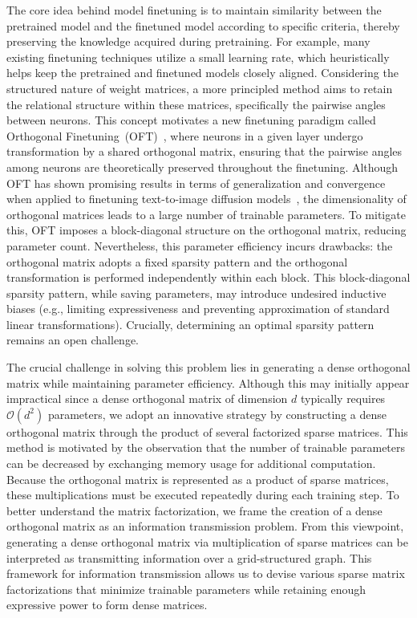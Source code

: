 The core idea behind model finetuning is to maintain similarity between the pretrained model and the finetuned model according to specific criteria, thereby preserving the knowledge acquired during pretraining. For example, many existing finetuning techniques utilize a small learning rate, which heuristically helps keep the pretrained and finetuned models closely aligned. Considering the structured nature of weight matrices, a more principled method aims to retain the relational structure within these matrices, specifically the pairwise angles between neurons. This concept motivates a new finetuning paradigm called Orthogonal Finetuning~(OFT)~\cite{qiu2023controlling}, where neurons in a given layer undergo transformation by a shared orthogonal matrix, ensuring that the pairwise angles among neurons are theoretically preserved throughout the finetuning. Although OFT has shown promising results in terms of generalization and convergence when applied to finetuning text-to-image diffusion models~\cite{qiu2023controlling}, the dimensionality of orthogonal matrices leads to a large number of trainable parameters. To mitigate this, OFT imposes a block-diagonal structure on the orthogonal matrix, reducing parameter count. Nevertheless, this parameter efficiency incurs drawbacks: the orthogonal matrix adopts a fixed sparsity pattern and the orthogonal transformation is performed independently within each block. This block-diagonal sparsity pattern, while saving parameters, may introduce undesired inductive biases (e.g., limiting expressiveness and preventing approximation of standard linear transformations). Crucially, determining an optimal sparsity pattern remains an open challenge.

The crucial challenge in solving this problem lies in generating a dense orthogonal matrix while maintaining parameter efficiency. Although this may initially appear impractical since a dense orthogonal matrix of dimension $d$ typically requires $\mathcal{O}(d^2)$ parameters, we adopt an innovative strategy by constructing a dense orthogonal matrix through the product of several factorized sparse matrices. This method is motivated by the observation that the number of trainable parameters can be decreased by exchanging memory usage for additional computation. Because the orthogonal matrix is represented as a product of sparse matrices, these multiplications must be executed repeatedly during each training step. To better understand the matrix factorization, we frame the creation of a dense orthogonal matrix as an information transmission problem. From this viewpoint, generating a dense orthogonal matrix via multiplication of sparse matrices can be interpreted as transmitting information over a grid-structured graph. This framework for information transmission allows us to devise various sparse matrix factorizations that minimize trainable parameters while retaining enough expressive power to form dense matrices.

